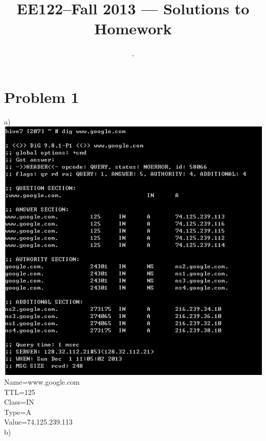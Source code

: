 \documentclass[11pt]{article}
\title{EE122--Fall 2013 --- Solutions to Homework \Homework}
\author{\Name, \texttt{\Login}}
\begin{document}
\maketitle

\section*{Problem 1}
a)\\
\includegraphics[scale=0.5]{122-hw3-1}\\
Name=www.google.com\\
TTL=125\\
Class=IN\\
Type=A\\
Value=74.125.239.113\\
\newpage
b)\\
\end{document}
